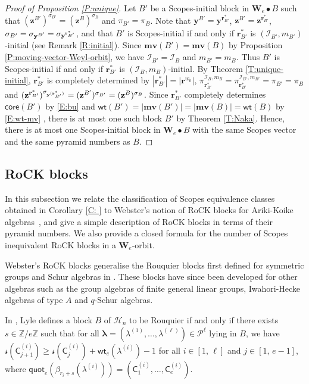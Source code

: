 \documentclass[11pt,a4paper,reqno]{amsart}
\numberwithin{equation}{section}
\theoremstyle{plain}
\theoremstyle{definition}
\theoremstyle{remark}
\numberwithin{equation}{section}
\newcommand{\bl}{\boldsymbol{\lambda}}
\newcommand{\fs}{\mathcal{s}}
\newcommand{\br}{\mathbf{r}}
\newcommand{\by}{\mathbf{y}}
\newcommand{\bz}{\mathbf{z}}
\newcommand{\wt}{\mathsf{wt}}
\newcommand{\core}{\mathsf{core}}
\newcommand{\quot}{\mathsf{quot}}
\newcommand{\mv}{\mathbf{mv}}
\newcommand{\ZZ}{\mathbb{Z}}
\newcommand{\HH}{\mathcal{H}}
\newcommand{\C}{\mathsf{C}}
\newcommand{\PP}{\mathcal{P}}
\newcommand{\AW}{\mathbf{W}}
\newcommand{\DDot}[1]{\mathrel{\overset{#1}{\bullet}}}
\newcommand{\II}{\mathcal{I}}
\begin{document}
\begin{proof}[Proof of Proposition \ref{P:unique}]
Let $B'$ be a Scopes-initial block in $\AW_e \DDot{} B$ such that
$(\bz^{B'})^{\sigma_{B'}} = (\bz^B)^{\sigma_B}$ and $\pi_{B'} = \pi_B$.
Note that $\by^{B'} = \by^{\br^*_{B'}}$, $\bz^{B'} = \bz^{\br^*_{B'}}$, $\sigma_{B'} = \sigma_{\by^{B\smash{'}}} = \sigma_{\smash[t]{\by^{\br^*_{B\smash{'}}}}}$, and that $B'$ is Scopes-initial if and only if $\br^*_{B'}$ is $(\II_{B'}, m_{B'})$-initial  (see Remark \ref{R:initial}).
Since $\mv(B') = \mv(B)$ by Proposition \ref{P:moving-vector-Weyl-orbit}, we have $\II_{B'} = \II_B$ and $m_{B'} = m_B$.
Thus $B'$ is Scopes-initial if and only if $\br^*_{B'}$ is $(\II_B,m_B)$-initial.
By Theorem \ref{T:unique-initial}, $\br^*_{B'}$ is completely determined by $|\br^*_{B'}| = |\br^{w_0}|$, $\pi^{\II_{B}, m_B}_{\br^*_{B'}} = \pi^{\II_{B'}, m_{B'}}_{\br^*_{B'}} = \pi_{B'} = \pi_B$ and $(\bz^{\br^*_{B'}})^{\sigma_{\by^{(\smash{\br^*_{B'}})}}} = (\bz^{B'})^{\sigma_{B'}} = (\bz^B)^{\sigma_{B}}$.
Since $\br^*_{B'}$ completely determines $\core(B')$ by \eqref{E:bu} and $\wt(B') = |\mv(B')| = |\mv(B)| = \wt(B)$ by \eqref{E:wt-mv}%
, there is at most one such block $B'$ by Theorem \ref{T:Naka}.  Hence, there is at most one Scopes-initial block in $\AW_e \DDot{} B$ with the same Scopes vector and the same pyramid numbers as $B$.
\end{proof}


\subsection{RoCK blocks} \label{S:RoCK}

In this subsection we relate the classification of Scopes equivalence classes obtained in Corollary \ref{C: } to Webster's notion of RoCK blocks for Ariki-Koike algebras~\cite{Webster}, and give a simple description of RoCK blocks in terms of their pyramid numbers.
We also provide a closed formula for the number of Scopes inequivalent RoCK blocks in a $\AW_e$-orbit.

Webster's RoCK blocks generalise the Rouquier blocks first defined for symmetric groups and Schur algebras in \cite{CT}.  
These blocks have since been developed for other algebras such as the group algebras of finite general linear groups, Iwahori-Hecke algebras of type $A$ and $q$-Schur algebras.  

In \cite{Lyle-RoCK}, Lyle defines a block $B$ of $\HH_n$ to be Rouquier if and only if there exists $s \in \ZZ/e\ZZ$ such that for all $\bl = (\lambda^{(1)},\dotsc, \lambda^{(\ell)}) \in \PP^{\ell}$ lying in $B$, we have $\fs(\C^{(i)}_{j+1}) \geq \fs(\C^{(i)}_j) + \wt_e(\lambda^{(i)}) -1$ for all $i \in [1,\, \ell]$ and $j \in [1,\, e-1]$, where $\quot_e(\beta_{r_i+s}(\lambda^{(i)})) = (\C^{(i)}_1,\dotsc, \C^{(i)}_e)$. %
\end{document}
